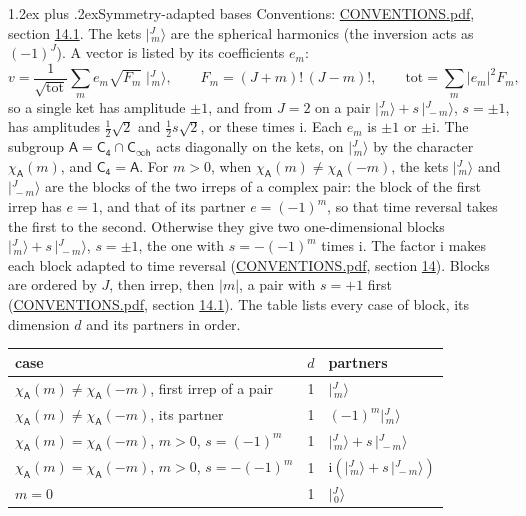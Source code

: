 \documentclass[10pt,a4paper]{article}
\makeatletter
\renewcommand\section{\@startsection{section}{1}{\z@}{-3ex plus -1ex minus -.2ex}%
  {1.2ex plus .2ex}{\normalfont\large\sffamily\bfseries\color{parttitle}}}
\numberwithin{equation}{section}
\newcommand{\grp}[1]{\mathsf{#1}}
\newcommand{\iunit}{\mathrm{i}}
\newcommand{\chiA}{\chi_{\grp{A}}}
\newcommand{\jm}[2]{\bigl\lvert{}^{#1}_{\,#2}\bigr\rangle}
\makeatother
\begin{document}
\section{Symmetry-adapted bases}\label{s:bases}
Conventions: \href{../../CONVENTIONS.pdf}{CONVENTIONS.pdf}, section \href{../../CONVENTIONS.pdf\#conv.14.1}{14.1}.
\leavevmode\label{n:index.m}\label{n:vector.ket}The kets $\jm{J}{m}$ are the spherical harmonics (the inversion acts as $(-1)^J$). \label{n:index.ketcoefficient}\label{n:vector.basis.symmetry}\label{n:index.ketweight}\label{n:index.total}A vector is listed by its coefficients $e_m$:
\begin{equation}\label{e:ket}v = \frac{1}{\sqrt{\mathrm{tot}}}\sum_m e_m\sqrt{F_m}\;\jm{J}{m},\qquad F_m = (J+m)!\,(J-m)!,\qquad \mathrm{tot} = \sum_m |e_m|^2F_m,\end{equation}
\leavevmode\label{n:index.pair.sign}so a single ket has amplitude $\pm1$, and from $J = 2$ on a pair $\jm{J}{m} + s\,\jm{J}{-m}$, $s = \pm1$, has amplitudes $\tfrac{1}{2}\sqrt{2}$ and $\tfrac{1}{2}s\sqrt{2}$, or these times $\iunit$. Each $e_m$ is $\pm1$ or $\pm\iunit$.
\leavevmode\label{n:group.A}\label{n:function.character.abelian}The subgroup $\grp{A} = \grp{C_{4}}\cap\grp{C_{\infty h}}$ acts diagonally on the kets, on $\jm{J}{m}$ by the character $\chiA(m)$, and $\grp{C_{4}} = \grp{A}$. For $m > 0$, when $\chiA(m) \ne \chiA(-m)$, the kets $\jm{J}{m}$ and $\jm{J}{-m}$ are the blocks of the two irreps of a complex pair: the block of the first irrep has $e = 1$, and that of its partner $e = (-1)^m$, so that time reversal takes the first to the second. Otherwise they give two one-dimensional blocks $\jm{J}{m} + s\,\jm{J}{-m}$, $s = \pm1$, the one with $s = -(-1)^m$ times $\iunit$. The factor $\iunit$ makes each block adapted to time reversal (\href{../../CONVENTIONS.pdf}{CONVENTIONS.pdf}, section \href{../../CONVENTIONS.pdf\#conv.14}{14}). Blocks are ordered by $J$, then irrep, then $|m|$, a pair with $s = +1$ first (\href{../../CONVENTIONS.pdf}{CONVENTIONS.pdf}, section \href{../../CONVENTIONS.pdf\#conv.14.1}{14.1}).
\leavevmode\label{n:head.case}\label{n:head.partners}The table lists every case of block, its dimension $d$ and its partners in order.
\begin{center}\begin{tabular}{@{}lrl@{}}\toprule
case & $d$ & partners\\\midrule
$\chiA(m) \ne \chiA(-m)$, first irrep of a pair & 1 & $\jm{J}{m}$\\
$\chiA(m) \ne \chiA(-m)$, its partner & 1 & $(-1)^m\jm{J}{m}$\\
$\chiA(m) = \chiA(-m)$, $m > 0$, $s = (-1)^m$ & 1 & $\jm{J}{m} + s\,\jm{J}{-m}$\\
$\chiA(m) = \chiA(-m)$, $m > 0$, $s = -(-1)^m$ & 1 & $\iunit(\jm{J}{m} + s\,\jm{J}{-m})$\\
$m = 0$ & 1 & $\jm{J}{0}$\\
\bottomrule\end{tabular}\end{center}
\end{document}

